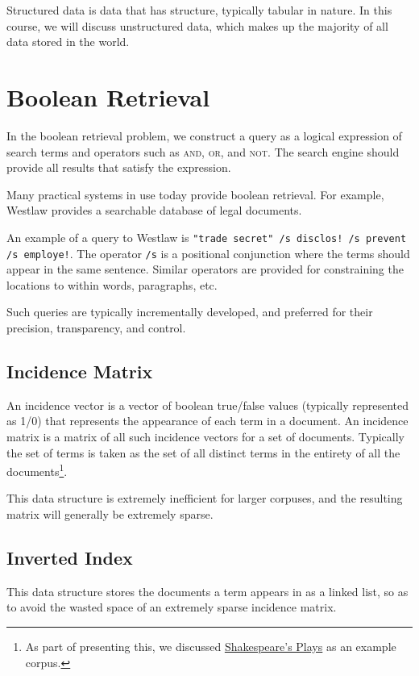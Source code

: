 \documentclass{idc_msc}
\begin{document}
Structured data is data that has structure, typically tabular in nature.
In this course, we will discuss unstructured data, which makes up the majority of all data stored in the world.

\section{Boolean Retrieval}

In the boolean retrieval problem, we construct a query as a logical expression of search terms and operators such as \textsc{and}, \textsc{or}, and \textsc{not}. The search engine should provide all results that satisfy the expression.

Many practical systems in use today provide boolean retrieval. For example, Westlaw provides a searchable database of legal documents.

An example of a query to Westlaw is \texttt{"trade secret" /s disclos! /s prevent /s employe!}.
The operator \texttt{/s} is a positional conjunction where the terms should appear in the same sentence.
Similar operators are provided for constraining the locations to within words, paragraphs, etc.

Such queries are typically incrementally developed, and preferred for their precision, transparency, and control.

\subsection{Incidence Matrix}

An incidence vector is a vector of boolean true/false values (typically represented as 1/0) that represents the appearance of each term in a document.
An incidence matrix is a matrix of all such incidence vectors for a set of documents. Typically the set of terms is taken as the set of all distinct terms in the entirety of all the documents\footnote{As part of presenting this, we discussed \href{https://old.datahub.io/dataset/william-shakespeare-plays}{Shakespeare's Plays} as an example corpus.}.

This data structure is extremely inefficient for larger corpuses, and the resulting matrix will generally be extremely sparse.

\subsection{Inverted Index}

This data structure stores the documents a term appears in as a linked list, so as to avoid the wasted space of an extremely sparse incidence matrix.
\end{document}
